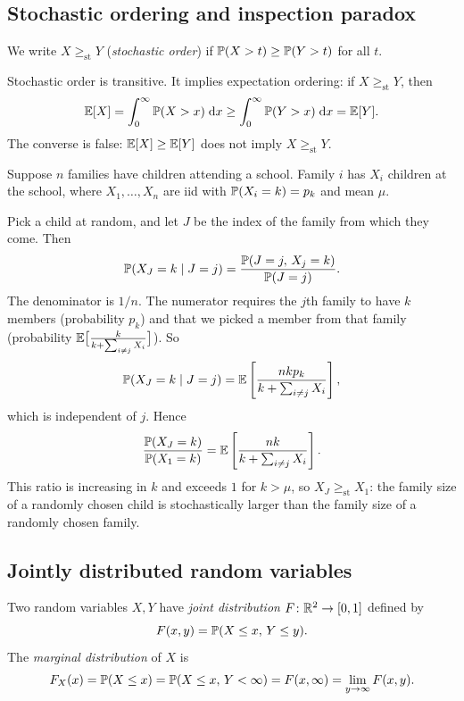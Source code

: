 \documentclass[a4paper]{article}
\begin{document}
\subsection{Stochastic ordering and inspection paradox}
\begin{defi}
  We write $X \geq_{\mathrm{st}} Y$ (\emph{stochastic order}) if $\P(X > t) \geq \P(Y > t)$ for all $t$.
\end{defi}

\begin{remark}
  Stochastic order is transitive.
  It implies expectation ordering: if $X \geq_{\mathrm{st}} Y$, then
  \[
    \E[X] = \int_0^\infty \P(X > x)\;\d x \geq \int_0^\infty \P(Y > x)\;\d x = \E[Y].
  \]
  The converse is false: $\E[X] \geq \E[Y]$ does not imply $X \geq_{\mathrm{st}} Y$.
\end{remark}

\begin{eg}
  Suppose $n$ families have children attending a school.
  Family $i$ has $X_i$ children at the school, where $X_1, \dotsc, X_n$ are iid with $\P(X_i = k) = p_k$ and mean $\mu$.

  Pick a child at random, and let $J$ be the index of the family from which they come. Then
  \[
    \P(X_J = k \mid J = j) = \frac{\P(J = j,\, X_j = k)}{\P(J = j)}.
  \]
  The denominator is $1/n$.
  The numerator requires the $j$th family to have $k$ members (probability $p_k$) and that we picked a member from that family (probability $\E\bigl[\frac{k}{k + \sum_{i \neq j} X_i}\bigr]$).
  So
  \[
    \P(X_J = k \mid J = j) = \E\left[\frac{nkp_k}{k + \sum_{i \neq j} X_i}\right],
  \]
  which is independent of $j$.
  Hence
  \[
    \frac{\P(X_J = k)}{\P(X_1 = k)} = \E\left[\frac{nk}{k + \sum_{i \neq j} X_i}\right].
  \]
  This ratio is increasing in $k$ and exceeds $1$ for $k > \mu$, so $X_J \geq_{\mathrm{st}} X_1$: the family size of a randomly chosen child is stochastically larger than the family size of a randomly chosen family.
\end{eg}

\subsection{Jointly distributed random variables}
\begin{defi}
  Two random variables $X, Y$ have \emph{joint distribution} $F \colon \R^2 \to [0, 1]$ defined by
  \[
    F(x, y) = \P(X \leq x,\, Y \leq y).
  \]
  The \emph{marginal distribution} of $X$ is
  \[
    F_X(x) = \P(X \leq x) = \P(X \leq x,\, Y < \infty) = F(x, \infty) = \lim_{y \to \infty} F(x, y).
  \]
\end{defi}
\end{document}
